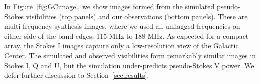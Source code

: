 \documentclass[twocolumn, trackchanges]{aastex61}
\begin{document}
In Figure~\ref{fig:GCimage}, we show images formed from the simulated pseudo-Stokes visibilities (top panels) and our observations (bottom panels). These are multi-frequency synthesis images, where we used all unflagged frequencies on either side of the band edges; 115 MHz to 188 MHz.   As expected for a compact array, the Stokes I images capture only a low-resolution view of the Galactic Center. The simulated and observed visibilities form remarkably similar images in Stokes I, Q and U, but the simulation under-predicts pseudo-Stokes V power. We defer further discussion to Section~\ref{sec:results}.
\end{document}
